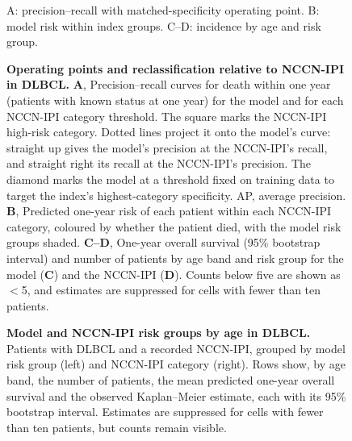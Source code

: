 \begin{figure}[p]
    {A: precision--recall with matched-specificity operating point. B: model
    risk within index groups. C--D: incidence by age and risk group.}
  \caption{\textbf{Operating points and reclassification relative to NCCN-IPI
  in DLBCL.} \textbf{A},
  Precision--recall curves for death within one year (patients with known status at one year) for the model and for each NCCN-IPI category
  threshold. The square marks the NCCN-IPI high-risk category. Dotted lines project it onto the model's curve: straight up gives the model's precision at the NCCN-IPI's recall, and straight right its recall at the NCCN-IPI's precision. The diamond marks the model at a threshold fixed on training data to target the index's highest-category specificity. AP, average
  precision. \textbf{B}, Predicted one-year risk of each patient within each
  NCCN-IPI category, coloured by whether the patient died, with the model risk groups shaded. \textbf{C--D}, One-year overall survival (95\% bootstrap
  interval) and number of patients by age band and risk group for the model
  (\textbf{C}) and the NCCN-IPI (\textbf{D}). Counts below five are shown as $<$5,
  and estimates are suppressed for cells with fewer than ten patients.}
  \label{fig:clinical-score}
\end{figure}

\begin{figure}[p]
  \caption{\textbf{Model and NCCN-IPI risk groups by age in DLBCL.} Patients with DLBCL and a
  recorded NCCN-IPI, grouped by model risk group (left) and NCCN-IPI category (right).
  Rows show, by age band, the number of patients, the mean predicted one-year overall survival and the observed Kaplan--Meier estimate, each
  with its 95\% bootstrap interval. Estimates are suppressed for cells with fewer than ten patients, but counts remain visible.}
  \label{fig:clinical-score-age}
\end{figure}

